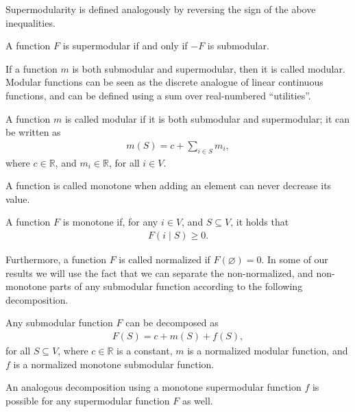 Supermodularity is defined analogously by reversing the sign of the above inequalities.
\begin{definition}[Supermodularity] \label{def:supermod}
A function $F$ is supermodular if and only if $-F$ is submodular.
\end{definition}

If a function $m$ is both submodular and supermodular, then it is called modular.
Modular functions can be seen as the discrete analogue of linear continuous functions, and can be defined using a sum over real-numbered ``utilities''.
\begin{definition}[Modularity]
A function $m$ is called modular if it is both submodular and supermodular; it can be written as
\begin{align*}
m(S) = c + \sum_{i \in S} m_i,
\end{align*}
where $c \in \mathbb{R}$, and $m_i \in \mathbb{R}$, for all $i \in V$.
\end{definition}

A function is called monotone when adding an element can never decrease its value.
\begin{definition}[Monotonicity]
A function $F$ is monotone if, for any $i \in V$, and $S \subseteq V$, it holds that
\begin{align*}
F(i \mid S) \geq 0.
\end{align*}
\end{definition}
Furthermore, a function $F$ is called normalized if $F(\varnothing) = 0$.
In some of our results we will use the fact that we can separate the non-normalized, and non-monotone parts of any submodular function according to the following decomposition.
\begin{definition} \label{def:decomp}
Any submodular function $F$ can be decomposed as
\begin{align} \label{eq:decomp}
  F(S) = c + m(S) + f(S),
\end{align}
for all $S \subseteq V$, where $c \in \mathbb{R}$ is a constant, $m$ is a normalized modular function, and $f$ is a normalized monotone submodular function.
\end{definition}
An analogous decomposition using a monotone supermodular function $f$ is possible for any supermodular function $F$ as well.

